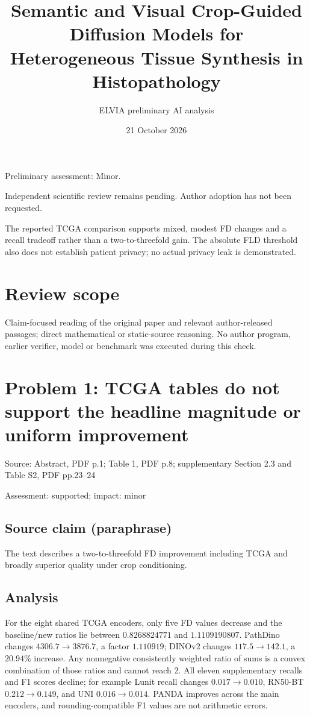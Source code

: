 \documentclass[11pt]{article}
\begin{document}
\title{Semantic and Visual Crop-Guided Diffusion Models for Heterogeneous Tissue Synthesis in Histopathology}

\author{ELVIA preliminary AI analysis}\date{21 October 2026}\maketitle

Preliminary assessment: Minor.\par

Independent scientific review remains pending. Author adoption has not been requested.

The reported TCGA comparison supports mixed, modest FD changes and a recall tradeoff rather than a two-to-threefold gain. The absolute FLD threshold also does not establish patient privacy; no actual privacy leak is demonstrated.

\section*{Review scope}

Claim-focused reading of the original paper and relevant author-released passages; direct mathematical or static-source reasoning. No author program, earlier verifier, model or benchmark was executed during this check.

\section*{Problem 1: TCGA tables do not support the headline magnitude or uniform improvement}

Source: Abstract, PDF p.1; Table 1, PDF p.8; supplementary Section 2.3 and Table S2, PDF pp.23–24

Assessment: supported; impact: minor

\subsection*{Source claim (paraphrase)}

The text describes a two-to-threefold FD improvement including TCGA and broadly superior quality under crop conditioning.

\subsection*{Analysis}

For the eight shared TCGA encoders, only five FD values decrease and the baseline/new ratios lie between \(0.8268824771\) and \(1.1109190807\). PathDino changes \(4306.7\to3876.7\), a factor \(1.110919\); DINOv2 changes \(117.5\to142.1\), a \(20.94\%\) increase. Any nonnegative consistently weighted ratio of sums is a convex combination of those ratios and cannot reach \(2\). All eleven supplementary recalls and F1 scores decline; for example Lunit recall changes \(0.017\to0.010\), RN50-BT \(0.212\to0.149\), and UNI \(0.016\to0.014\). PANDA improves across the main encoders, and rounding-compatible F1 values are not arithmetic errors.
\end{document}
